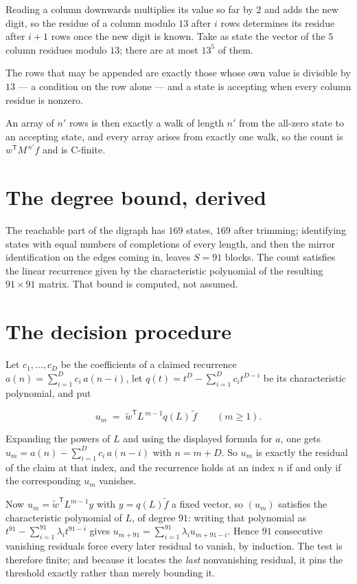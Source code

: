 \documentclass[11pt]{article}
\theoremstyle{definition}
\begin{document}
Reading a column downwards multiplies its value so far by $2$ and adds the new digit, so the residue of a column modulo $13$ after $i$ rows determines its residue after $i+1$ rows once the new digit is known. Take as state the vector of the $5$ column residues modulo $13$; there are at most $13^{5}$ of them.

The rows that may be appended are exactly those whose own value is divisible by $13$ --- a condition on the row alone --- and a state is accepting when every column residue is nonzero.

An array of $n'$ rows is then exactly a walk of length $n'$ from the all-zero state to an accepting state, and every array arises from exactly one walk, so the count is $w^{\mathsf T}M^{\,n'}f$ and is C-finite.

\section{The degree bound, derived}

The reachable part of the digraph has $169$ states, $169$ after trimming; identifying states with equal numbers of completions of every length, and then the mirror identification on the edges coming in, leaves $S = 91$ blocks. The count satisfies the linear recurrence given by the characteristic polynomial of the resulting $91\times91$ matrix. That bound is computed, not assumed.

\section{The decision procedure}

Let $c_1,\dots,c_D$ be the coefficients of a claimed recurrence $a(n) = \sum_{i=1}^{D} c_i\,a(n-i)$, let $q(t) = t^{D} - \sum_{i=1}^{D} c_i t^{D-i}$ be its characteristic polynomial, and put

\[u_m \;=\; \tilde w^{\mathsf T} L^{\,m-1} q(L)\,\tilde f \qquad (m \ge 1).\]

Expanding the powers of $L$ and using the displayed formula for $a$, one gets $u_m = a(n) - \sum_{i=1}^{D} c_i\,a(n-i)$ with $n = m + D$. So $u_m$ is exactly the residual of the claim at that index, and the recurrence holds at an index $n$ if and only if the corresponding $u_m$ vanishes.

Now $u_m = \tilde w^{\mathsf T} L^{m-1} y$ with $y = q(L)\tilde f$ a fixed vector, so $(u_m)$ satisfies the characteristic polynomial of $L$, of degree $91$: writing that polynomial as $t^{91} - \sum_{i=1}^{91} \lambda_i t^{91-i}$ gives $u_{m+91} = \sum_{i=1}^{91} \lambda_i u_{m+91-i}$. Hence $91$ consecutive vanishing residuals force every later residual to vanish, by induction. The test is therefore finite; and because it locates the {\itshape last} nonvanishing residual, it pins the threshold exactly rather than merely bounding it.
\end{document}
